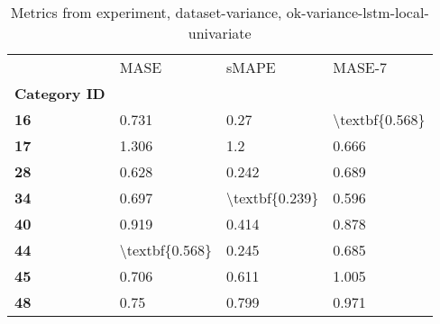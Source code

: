 \begin{table}[h]
\centering
\caption{Metrics from experiment, dataset-variance, ok-variance-lstm-local-univariate}
\label{table:ok-variance-lstm-local-univariate-dataset-variance}
\begin{tabular}{llll}
\toprule
{} &            MASE &           sMAPE &          MASE-7 \\
\textbf{Category ID} &                 &                 &                 \\
\midrule
\textbf{16         } &           0.731 &            0.27 &  \textbackslash textbf\{0.568\} \\
\textbf{17         } &           1.306 &             1.2 &           0.666 \\
\textbf{28         } &           0.628 &           0.242 &           0.689 \\
\textbf{34         } &           0.697 &  \textbackslash textbf\{0.239\} &           0.596 \\
\textbf{40         } &           0.919 &           0.414 &           0.878 \\
\textbf{44         } &  \textbackslash textbf\{0.568\} &           0.245 &           0.685 \\
\textbf{45         } &           0.706 &           0.611 &           1.005 \\
\textbf{48         } &            0.75 &           0.799 &           0.971 \\
\bottomrule
\end{tabular}
\end{table}
